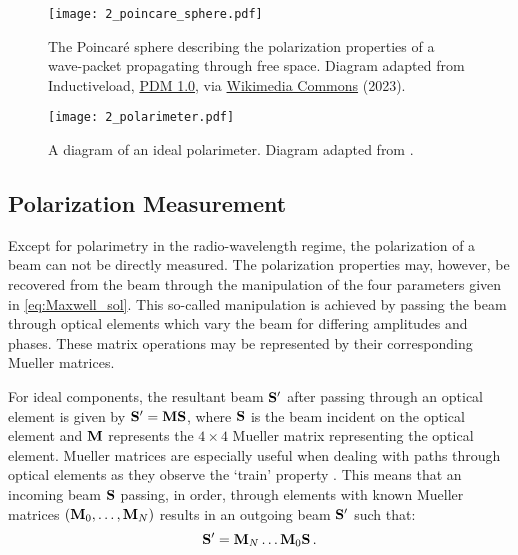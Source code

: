 \begin{figure}[t]
    \centering
    \texttt{[image: 2\_poincare\_sphere.pdf]}
    \caption{The Poincar{\'e} sphere describing the polarization properties of a wave-packet propagating through free space. Diagram adapted from Inductiveload, \protect\href{https://creativecommons.org/publicdomain/mark/1.0/}{PDM 1.0}, via \protect\href{https://commons.wikimedia.org/wiki/File:Poincaré_sphere.svg}{Wikimedia Commons} (2023).}
    \label{fig:poincare}
\end{figure}


\begin{figure}[t]
    \centering
    \texttt{[image: 2\_polarimeter.pdf]}
    \caption{A diagram of an ideal polarimeter. Diagram adapted from \cite{pol_in_spectra}.}
    \label{fig:polarimeter}
\end{figure}

\subsection{Polarization Measurement} \label{subsec:pol_measure}

Except for polarimetry in the radio-wavelength regime, the polarization of a beam can not be directly measured. The polarization properties may, however, be recovered from the beam through the manipulation of the four parameters given in \autoref{eq:Maxwell_sol}. This so-called manipulation is achieved by passing the beam through optical elements which vary the beam for differing amplitudes and phases. These matrix operations may be represented by their corresponding Mueller matrices.

For ideal components, the resultant beam $\mathbf{S}^{\prime}$ after passing through an optical element is given by $\mathbf{S}^{\prime} = \mathbf{M} \mathbf{S}$, where $\mathbf{S}$ is the beam incident on the optical element and $\mathbf{M}$ represents the $4 \times 4$ Mueller matrix representing the optical element. Mueller matrices are especially useful when dealing with paths through optical elements as they observe the `train' property \citep{Mueller_train}. This means that an incoming beam $\mathbf{S}$ passing, in order, through elements with known Mueller matrices $(\mathbf{M}_{0}, \dots, \mathbf{M}_{N})$ results in an outgoing beam $\mathbf{S}^{\prime}$ such that:
\begin{equation} \label{eq:mueller_train}
    \mathbf{S}^{\prime} = \mathbf{M}_{N} \dots \mathbf{M}_{0} \mathbf{S}\,.
\end{equation}

